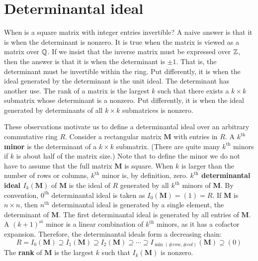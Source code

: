 \section{Determinantal ideal}
\label{sec:det-ideal}

When is a square matrix with integer entries invertible?
A naive answer is that it is when the determinant is nonzero.
It is true when the matrix is viewed as a matrix over $\mathbb{Q}$.
If we insist that the inverse matrix must be expressed over $\mathbb{Z}$,
then the answer is that it is when the determinant is $\pm 1$.
That is, the determinant must be invertible within the ring.
Put differently, it is when the ideal generated by the determinant is the unit ideal.
The determinant has another use. The rank of a matrix is the largest $k$ such that
there exists a $k \times k$ submatrix whose determinant is a nonzero.
Put differently, it is when the ideal generated by determinants of all $k \times k$ submatrices
is nonzero.

These observations motivate us to define a determinantal ideal over an arbitrary commutative ring $R$.
Consider a rectangular matrix $\mathbf M$ with entries in $R$.
A {\bf $k^\text{th}$ minor} is the determinant of a $k \times k$ submatrix.
(There are quite many $k^\text{th}$ minors if $k$ is about half of the matrix size.)
Note that to define the minor we do not have to assume that the full matrix $\mathbf M$ is square.
When $k$ is larger than the number of rows or columns, $k^\text{th}$ minor is, by definition, zero.
{\bf $k^\text{th}$ determinantal ideal $I_k(\mathbf M)$} of $\mathbf M$ is the ideal of $R$ 
generated by all $k^\text{th}$ minors of $\mathbf M$.
By convention, $0^\text{th}$ determinantal ideal is taken as $I_0(\mathbf M) = (1) = R$.
If $\mathbf M$ is $n \times n$, then $n^\text{th}$ determinantal ideal is generated by a single element,
the determinant of $\mathbf M$.
The first determinantal ideal is generated by all entries of $\mathbf M$.
A $(k+1)^\text{st}$ minor is a linear combination of $k^\text{th}$ minors,
as it has a cofactor expansion.
Therefore, the determinantal ideals form a decreasing chain:
\[
 R = I_0(\mathbf M) \supseteq I_1(\mathbf M) \supseteq I_2(\mathbf M) \supseteq \cdots 
    \supseteq I_{\min( \# row, \# col)}( \mathbf M ) \supseteq (0)
\]
The {\bf rank} of $\mathbf M$ is the largest $k$ such that $I_k(\mathbf M)$ is nonzero.


